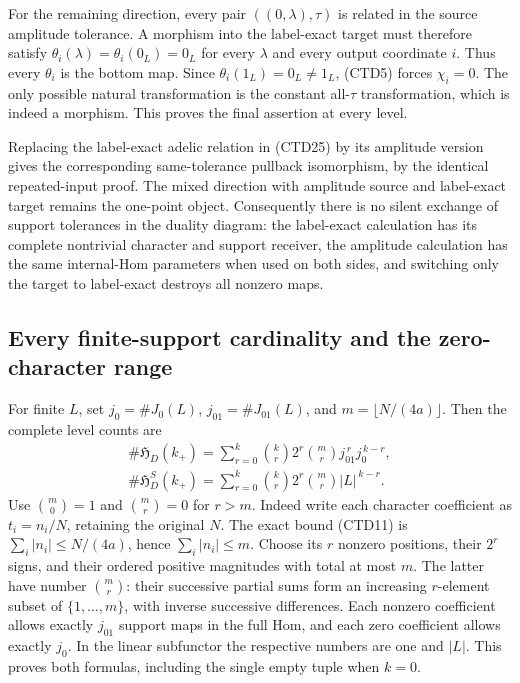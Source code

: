 For the remaining direction, every pair
$((0,\lambda),\tau)$ is related in the source amplitude
tolerance. A morphism into the label-exact target must
therefore satisfy $\theta_i(\lambda)=\theta_i(0_L)=0_L$
for every $\lambda$ and every output coordinate $i$.
Thus every $\theta_i$ is the bottom map. Since
$\theta_i(1_L)=0_L\ne1_L$, (CTD5) forces $\chi_i=0$.
The only possible natural transformation is the constant
all-$\tau$ transformation, which is indeed a morphism.
This proves the final assertion at every level.

Replacing the label-exact adelic relation in (CTD25) by its
amplitude version gives the corresponding same-tolerance
pullback isomorphism, by the identical repeated-input proof.
The mixed direction with amplitude source and label-exact
target remains the one-point object. Consequently there is
no silent exchange of support tolerances in the duality
diagram: the label-exact calculation has its complete
nontrivial character and support receiver, the amplitude
calculation has the same internal-Hom parameters when used
on both sides, and switching only the target to label-exact
destroys all nonzero maps.

\subsection{Every finite-support cardinality and the zero-character range}

For finite $L$, set
$j_0=\#J_0(L)$, $j_{01}=\#J_{01}(L)$, and
$m=\lfloor N/(4a)\rfloor$. Then the complete level counts are
\begin{equation}\tag{CTD29}
\begin{gathered}
\#\mathfrak H_D(k_+)
=\sum_{r=0}^{k}\binom{k}{r}2^r\binom{m}{r}
       j_{01}^{\,r}j_0^{\,k-r},\\
\#\mathfrak H_D^S(k_+)
=\sum_{r=0}^{k}\binom{k}{r}2^r\binom{m}{r}|L|^{\,k-r}.
\end{gathered}
\end{equation}
Use $\binom m0=1$ and $\binom mr=0$ for $r>m$.
Indeed write each character coefficient as $t_i=n_i/N$,
retaining the original $N$. The exact bound (CTD11) is
$\sum_i|n_i|\le N/(4a)$, hence $\sum_i|n_i|\le m$.
Choose its $r$ nonzero positions, their $2^r$ signs, and their
ordered positive magnitudes with total at most $m$.
The latter have number $\binom mr$: their successive partial
sums form an increasing $r$-element subset of
$\{1,\ldots,m\}$, with inverse successive differences.
Each nonzero coefficient allows exactly $j_{01}$ support
maps in the full Hom, and each zero coefficient allows
exactly $j_0$. In the linear subfunctor the respective numbers
are one and $|L|$. This proves both formulas, including
the single empty tuple when $k=0$.

